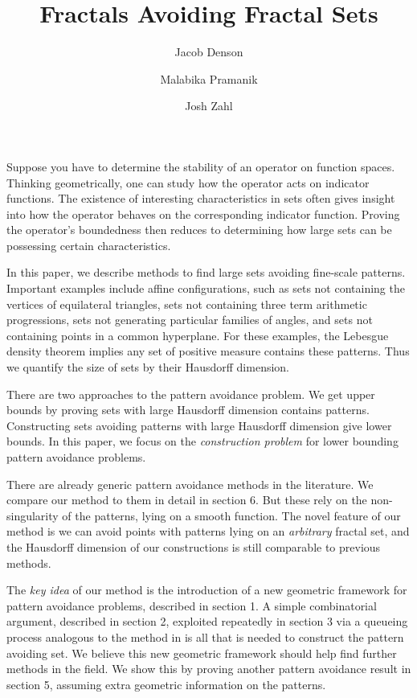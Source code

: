 \documentclass{article}
\title{Fractals Avoiding Fractal Sets}
\author{Jacob Denson\\ \and Malabika Pramanik\\ \and Josh Zahl}
\theoremstyle{plain}
\theoremstyle{plain}
\begin{document}
\maketitle

\begin{multicols}{2}

\begin{abstract}
	\blindtext[1]
\end{abstract}

Suppose you have to determine the stability of an operator on function spaces. Thinking geometrically, one can study how the operator acts on indicator functions. The existence of interesting characteristics in sets often gives insight into how the operator behaves on the corresponding indicator function. Proving the operator's boundedness then reduces to determining how large sets can be possessing certain characteristics.


In this paper, we describe methods to find large sets avoiding fine-scale patterns. Important examples include affine configurations, such as sets not containing the vertices of equilateral triangles, sets not containing three term arithmetic progressions, sets not generating particular families of angles, and sets not containing points in a common hyperplane. For these examples, the Lebesgue density theorem implies any set of positive measure contains these patterns. Thus we quantify the size of sets by their Hausdorff dimension.

There are two approaches to the pattern avoidance problem. We get upper bounds by proving sets with large Hausdorff dimension contains patterns. Constructing sets avoiding patterns with large Hausdorff dimension give lower bounds. In this paper, we focus on the {\it construction problem} for lower bounding pattern avoidance problems.

There are already generic pattern avoidance methods in the literature. We compare our method to them in detail in section 6. But these rely on the non-singularity of the patterns, lying on a smooth function. The novel feature of our method is we can avoid points with patterns lying on an {\it arbitrary} fractal set, and the Hausdorff dimension of our constructions is still comparable to previous methods.

The {\it key idea} of our method is the introduction of a new geometric framework for pattern avoidance problems, described in section 1. A simple combinatorial argument, described in section 2, exploited repeatedly in section 3 via a queueing process analogous to the method in \cite{MalabikaRob} is all that is needed to construct the pattern avoiding set. We believe this new geometric framework should help find further methods in the field. We show this by proving another pattern avoidance result in section 5, assuming extra geometric information on the patterns.


\end{multicols}
\end{document}
